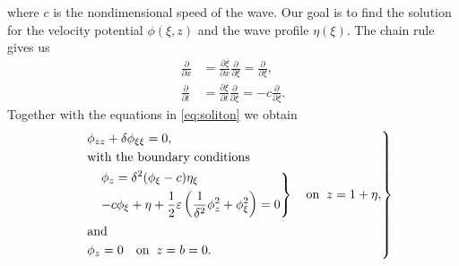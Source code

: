 where $c$ is the nondimensional speed of the wave. Our goal is to find the
solution for the velocity potential $\phi(\xi, z)$ and the wave profile
$\eta(\xi)$. The chain rule gives us
\begin{align}
    \frac{\partial }{\partial x} &= \frac{\partial \xi}{\partial x}
    \frac{\partial }{\partial \xi}  = \frac{\partial }{\partial \xi}, \\
    \frac{\partial }{\partial t} &= \frac{\partial \xi}{\partial t}
    \frac{\partial }{\partial \xi}  = -c\frac{\partial }{\partial \xi}.
\end{align}
Together with the equations in \ref{eq:soliton} we obtain
\begin{align}\label{eq:soliton-xi}
    \begin{drcases}
   & \phi_{zz} + \delta \phi_{\xi\xi}  = 0,\\
   &\text{with the boundary conditions}\\
   &\begin{drcases}
    &\phi_z = \delta^2 (\phi_\xi -c)\eta_\xi \\
    &-c\phi_\xi + \eta +  \frac{1}{2}\varepsilon\left( \frac{1}{\delta^2}\phi^2_z
    + \phi_\xi^2\right)  =0
  \end{drcases}\quad \text{on}\;\; z = 1+\eta,\\
   &\text{and}\\
   & \phi_z =0 \quad \text{on}\;\; z = b = 0.
    \end{drcases}
\end{align}
